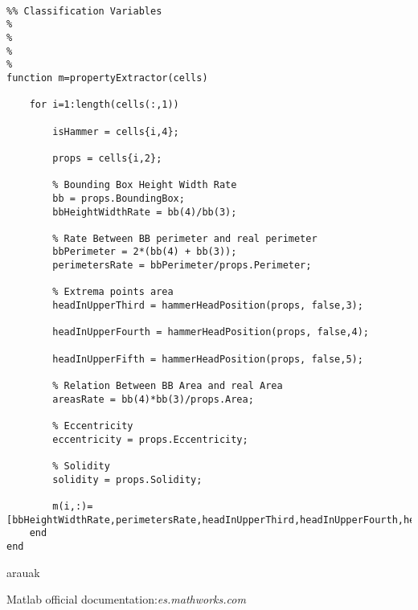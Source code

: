 \documentclass[es,gi]{ifirak}\usepackage[]{graphicx}\usepackage[]{color}
\begin{document}
\begin{lstlisting}

%% Classification Variables
%
%  
%
%
function m=propertyExtractor(cells)
    
    for i=1:length(cells(:,1))
        
        isHammer = cells{i,4};
        
        props = cells{i,2};

        % Bounding Box Height Width Rate
        bb = props.BoundingBox;
        bbHeightWidthRate = bb(4)/bb(3);

        % Rate Between BB perimeter and real perimeter
        bbPerimeter = 2*(bb(4) + bb(3));
        perimetersRate = bbPerimeter/props.Perimeter;

        % Extrema points area
        headInUpperThird = hammerHeadPosition(props, false,3);

        headInUpperFourth = hammerHeadPosition(props, false,4);

        headInUpperFifth = hammerHeadPosition(props, false,5);

        % Relation Between BB Area and real Area
        areasRate = bb(4)*bb(3)/props.Area;

        % Eccentricity
        eccentricity = props.Eccentricity;
        
        % Solidity
        solidity = props.Solidity;
        
        m(i,:)= [bbHeightWidthRate,perimetersRate,headInUpperThird,headInUpperFourth,headInUpperFifth,areasRate,eccentricity,solidity,isHammer];
    end
end
\end{lstlisting}


\begin{thebibliography}{arauak}
	
	 Matlab official documentation:\textit{es.mathworks.com}
	
\end{thebibliography}
\end{document}
